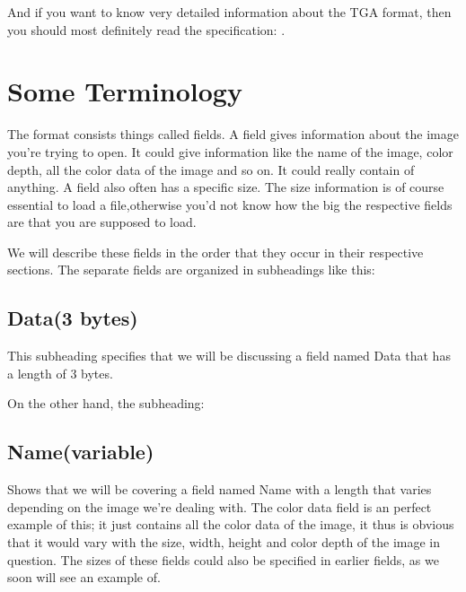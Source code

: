 \begin{refsection}
  And if you want to know very detailed information about the TGA
  format, then you should most definitely read the \tga specification:
  \cite{91:_truev_tga_file_format_specif}.

  \section{Some Terminology}

  The \tga format consists things called fields. A field
  gives information about the image you're trying to open. It could
  give information like the name of the image, color depth, all the
  color data of the image and so on. It could really contain of
  anything. A field also often has a specific size. The size
  information is of course essential to load a \tga file,otherwise
  you'd not know how the big the respective fields are that you are
  supposed to load.

  \newcommand{\plural}[3]{\ifstrequal{#1}{1}{#2}{#3}}
  \newcommand{\fieldlength}[1]{\ifstrequal{#1}{0}{variable}{#1 \plural{#1}{byte}{bytes}}}
  \newcommand{\imgfield}[2]{\subsection*{#1(\fieldlength{#2})}}
  \newcommand{\imgsubfield}[2]{\subsubsection*{#1(\fieldlength{#2})}}

  We will describe these fields in the order that they occur in their
  respective sections. The separate fields are organized in
  subheadings like this:

  \imgfield{Data}{3}

  This subheading specifies that we will be discussing a field named
  Data that has a length of 3 bytes.

  On the other hand, the subheading:

  \imgfield{Name}{0}

  Shows that we will be covering a field named Name with a length that
  varies depending on the image we're dealing with. The color data
  field is an perfect example of this; it just contains all the color
  data of the image, it thus is obvious that it would vary with the
  size, width, height and color depth of the image in question. The
  sizes of these fields could also be specified in earlier fields, as
  we soon will see an example of.


\end{refsection}
